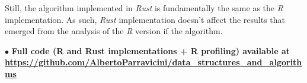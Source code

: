\documentclass[
12pt,
a4paper,
oneside,
headinclude,
footinclude]{article}
\begin{document}
Still, the algorithm implemented in \textit{Rust} is fundamentally the same as the \textit{R} implementation.
As such, \textit{Rust} implementation doesn't affect the results that emerged from the analysis of the \textit{R} version if the algorithm.

\vspace{20mm}
$\bullet$ \textbf{Full code (R and Rust implementations + R profiling) available at \newline \href{https://github.com/AlbertoParravicini/data_structures_and_algorithms}{https://github.com/AlbertoParravicini/data\_structures\_and\_algorithms}}
\end{document}
